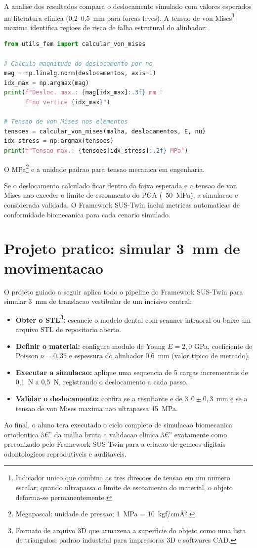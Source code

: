 A analise dos resultados compara o deslocamento simulado com valores
esperados na literatura clinica (0,2--0,5~mm para forcas leves). A tensao de
von Mises\footnote{Indicador unico que combina as tres direcoes de tensao em
um numero escalar; quando ultrapassa o limite de escoamento do material, o
objeto deforma-se permanentemente.} maxima identifica regioes de risco de
falha estrutural do alinhador:

\begin{lstlisting}[language=Python,caption={Calculo de deslocamento e tensao
de von Mises para validacao}]
from utils_fem import calcular_von_mises

# Calcula magnitude do deslocamento por no
mag = np.linalg.norm(deslocamentos, axis=1)
idx_max = np.argmax(mag)
print(f"Desloc. max.: {mag[idx_max]:.3f} mm "
      f"no vertice {idx_max}")

# Tensao de von Mises nos elementos
tensoes = calcular_von_mises(malha, deslocamentos, E, nu)
idx_stress = np.argmax(tensoes)
print(f"Tensao max.: {tensoes[idx_stress]:.2f} MPa")
\end{lstlisting}

O MPa\footnote{Megapascal: unidade de pressao;
1~MPa = 10~kgf/cmÂ².} e a unidade padrao para tensao mecanica em engenharia.

Se o deslocamento calculado ficar dentro da faixa esperada e a tensao de
von Mises nao exceder o limite de escoamento do PGA (~50~MPa), a simulacao
e considerada validada. O Framework SUS-Twin inclui metricas automaticas de
conformidade biomecanica para cada cenario simulado.

\section{Projeto pratico: simular 3~mm de movimentacao}

O projeto guiado a seguir aplica todo o pipeline do Framework SUS-Twin para
simular 3~mm de translacao vestibular de um incisivo central:

\begin{itemize}
    \item \textbf{Obter o STL\footnote{Formato de arquivo 3D que armazena a
    superficie do objeto como uma lista de triangulos; padrao industrial para
    impressoras 3D e softwares CAD.}:} escaneie o modelo dental com scanner
    intraoral ou baixe um arquivo STL de repositorio aberto.
    \item \textbf{Definir o material:} configure modulo de Young $E = 2,0$
    GPa, coeficiente de Poisson $\nu = 0,35$ e espessura do alinhador
    0,6~mm (valor tipico de mercado).
    \item \textbf{Executar a simulacao:} aplique uma sequencia de 5 cargas
    incrementais de 0,1~N a 0,5~N, registrando o deslocamento a cada passo.
    \item \textbf{Validar o deslocamento:} confira se a resultante e de
    $3,0 \pm 0,3$~mm e se a tensao de von Mises maxima nao ultrapassa
    45~MPa.
\end{itemize}

Ao final, o aluno tera executado o ciclo completo de simulacao biomecanica
ortodontica â€” da malha bruta a validacao clinica â€” exatamente como preconizado
pelo Framework SUS-Twin para a criacao de gemeos digitais odontologicos
reprodutiveis e auditaveis.
